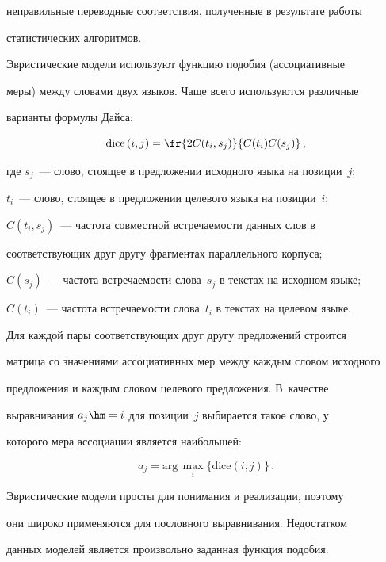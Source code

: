 неправильные переводные соответствия, полученные в результате работы


статистических алгоритмов.





     Эвристические модели используют функцию подобия (ассоциативные


меры) между словами двух языков. Чаще всего используются различные


варианты формулы Дайса:


     $$


     \mathrm{dice}\left(i,j\right) =\fr{2C(t_i,s_j)}{C(t_i) C(s_j)}\,,


     $$


где $s_j$~--- слово, стоящее в предложении исходного языка на позиции~$j$;


$t_i$~--- слово, стоящее в предложении целевого языка на позиции~$i$;


$C(t_i,s_j)$~--- частота совместной встречаемости данных слов в


соответствующих друг другу фрагментах параллельного корпуса;


$C(s_j)$~--- частота встречаемости слова~$s_j$ в текстах на исходном языке;


$C(t_i)$~--- частота встречаемости слова~$t_i$ в текстах на целевом языке.





     Для каждой пары соответствующих друг другу предложений строится


матрица со значениями ассоциативных мер между каждым словом исходного


предложения и каждым словом целевого предложения. В~качестве


выравнивания $a_j\hm=i$ для позиции~$j$ выбирается такое слово, у


которого мера ассоциации является наибольшей:


     $$


     a_j=\mathrm{arg}\,\max_i \{ \mathrm{dice}\left(i,j\right)\}\,.


     $$





     Эвристические модели просты для понимания и реализации, поэтому


они широко применяются для пословного выравнивания. Недостатком


данных моделей является произвольно заданная функция подобия.



